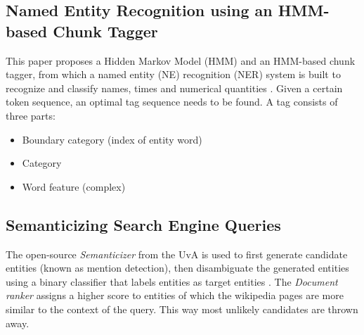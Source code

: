 \documentclass{article}
\begin{document}
\subsection*{Named Entity Recognition using an HMM-based Chunk Tagger}
This paper proposes a Hidden Markov Model (HMM) and an HMM-based chunk tagger, from which a named entity (NE)
recognition (NER) system is built to recognize and classify names, times and numerical quantities \cite{zhou2002named}. Given a certain token sequence, an optimal tag sequence needs to be found. A tag consists of three parts:
\begin{itemize}
    \item Boundary category (index of entity word)
    \item Category
    \item Word feature (complex)
\end{itemize}

\subsection*{Semanticizing Search Engine Queries}
The open-source \textit{Semanticizer} from the UvA is used to first generate candidate entities (known as mention detection), then disambiguate the generated entities using a binary classifier that labels entities as target entities \cite{graus2014semanticizing}. The \textit{Document ranker} assigns a higher score to entities of which the wikipedia pages are more similar to the context of the query. This way most unlikely candidates are thrown away.



\end{document}
